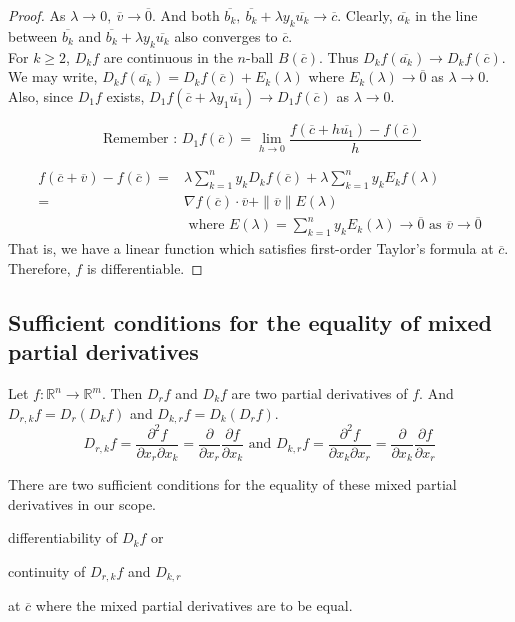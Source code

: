 \begin{proof}
	As $\lambda{} \to 0,\ \overline{v} \to \overline{0}$. And both $\overline{b_k},\ \overline{b_k}+\lambda{}y_k\overline{u_k} \to \overline{c}$. Clearly, $\overline{a_k}$ in the line between $\overline{b_k}$ and $\overline{b_k}+\lambda{} y_k \overline{u_k}$ also converges to $\overline{c}$.\\
	
	For $k \ge 2$, $D_kf$ are continuous in the $n$-ball $B(\overline{c})$. Thus $D_kf(\overline{a_k}) \to D_kf(\overline{c})$. We may write, $D_kf(\overline{a_k}) = D_kf(\overline{c}) + E_k(\lambda)$ where $E_k(\lambda) \to \overline{0}$ as $\lambda{} \to 0$. Also, since $D_1 f$ exists, $D_1f(\overline{c}+\lambda{} y_1\overline{u_1}) \to D_1f(\overline{c})$ as $\lambda{} \to 0$. \begin{commentary} \[ \text{ Remember : } D_1 f(\overline{c}) = \lim_{h \to 0} \frac{f(\overline{c}+h\overline{u_1}) - f(\overline{c})}{h} \] \end{commentary}
	\begin{align*}
		f(\overline{c}+\overline{v}) - f(\overline{c}) = & \lambda{} \sum_{k = 1}^n y_kD_kf(\overline{c}) + \lambda{} \sum_{k = 1}^n y_kE_kf(\lambda{})\\
		= & \nabla f(\overline{c}) \cdot \overline{v} + \|\overline{v}\|E(\lambda) \\
		& \text{ where } E(\lambda{}) = \sum_{k = 1}^n y_k E_k(\lambda{}) \to \overline{0} \text{ as } \overline{v} \to \overline{0}
	\end{align*}
	That is, we have a linear function which satisfies first-order Taylor's formula at $\overline{c}$. Therefore, $f$ is differentiable.
\end{proof}

\subsection{Sufficient conditions for the equality of mixed partial derivatives}
Let $f : \mathbb{R}^n \to \mathbb{R}^m$. Then $D_r f$ and $D_k f$ are two partial derivatives of $f$. And $D_{r,k} f = D_r(D_k f)$ and $D_{k,r} f = D_k (D_r f)$.
\[ D_{r,k} f = \frac{\partial^2 f}{\partial x_r \partial x_k} = \frac{\partial}{\partial x_r} \frac{\partial f}{\partial x_k} \text{ and } D_{k,r} f = \frac{\partial^2 f}{\partial x_k \partial x_r} = \frac{\partial}{\partial x_k} \frac{\partial f}{\partial x_r}  \]
\begin{commentary}There are two sufficient conditions for the equality of these mixed partial derivatives in our scope. \begin{enumerate*} \item differentiability of $D_k f$ or \item continuity of $D_{r,k} f$ and $D_{k,r}$ \end{enumerate*} at $\overline{c}$ where the mixed partial derivatives are to be equal.\end{commentary}
